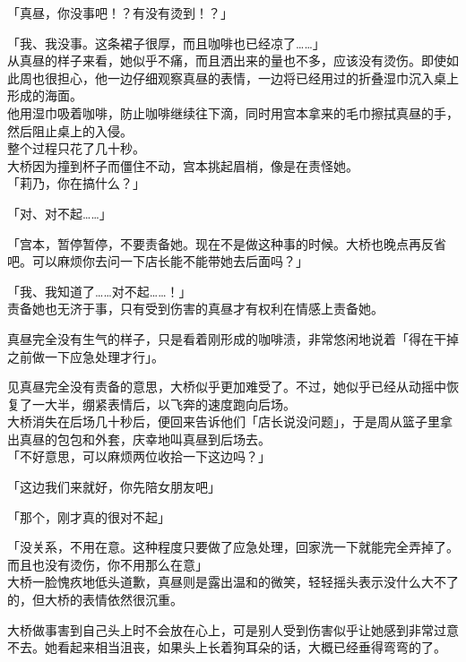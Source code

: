 「真昼，你没事吧！？有没有烫到！？」

「我、我没事。这条裙子很厚，而且咖啡也已经凉了……」\\

从真昼的样子来看，她似乎不痛，而且洒出来的量也不多，应该没有烫伤。即使如此周也很担心，他一边仔细观察真昼的表情，一边将已经用过的折叠湿巾沉入桌上形成的海面。\\

他用湿巾吸着咖啡，防止咖啡继续往下滴，同时用宫本拿来的毛巾擦拭真昼的手，然后阻止桌上的入侵。\\

整个过程只花了几十秒。\\

大桥因为撞到杯子而僵住不动，宫本挑起眉梢，像是在责怪她。\\

「莉乃，你在搞什么？」

「对、对不起……」

「宫本，暂停暂停，不要责备她。现在不是做这种事的时候。大桥也晚点再反省吧。可以麻烦你去问一下店长能不能带她去后面吗？」

「我、我知道了……对不起……！」\\

责备她也无济于事，只有受到伤害的真昼才有权利在情感上责备她。

真昼完全没有生气的样子，只是看着刚形成的咖啡渍，非常悠闲地说着「得在干掉之前做一下应急处理才行」。

见真昼完全没有责备的意思，大桥似乎更加难受了。不过，她似乎已经从动摇中恢复了一大半，绷紧表情后，以飞奔的速度跑向后场。\\

大桥消失在后场几十秒后，便回来告诉他们「店长说没问题」，于是周从篮子里拿出真昼的包包和外套，庆幸地叫真昼到后场去。\\

「不好意思，可以麻烦两位收拾一下这边吗？」

「这边我们来就好，你先陪女朋友吧」

「那个，刚才真的很对不起」

「没关系，不用在意。这种程度只要做了应急处理，回家洗一下就能完全弄掉了。而且也没有烫伤，你不用那么在意」\\

大桥一脸愧疚地低头道歉，真昼则是露出温和的微笑，轻轻摇头表示没什么大不了的，但大桥的表情依然很沉重。

大桥做事害到自己头上时不会放在心上，可是别人受到伤害似乎让她感到非常过意不去。她看起来相当沮丧，如果头上长着狗耳朵的话，大概已经垂得弯弯的了。\\

